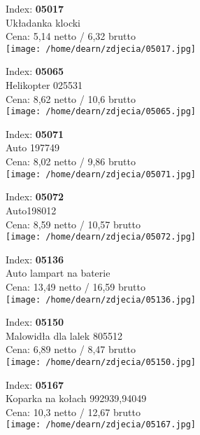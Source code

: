 {Index: \textbf{05017}\\
Układanka klocki\\
Cena: 5,14 netto / 6,32 brutto\\
  \texttt{[image: /home/dearn/zdjecia/05017.jpg]}}\newline\newline

{Index: \textbf{05065}\\
Helikopter 025531\\
Cena: 8,62 netto / 10,6 brutto\\
  \texttt{[image: /home/dearn/zdjecia/05065.jpg]}}\newline\newline

{Index: \textbf{05071}\\
Auto 197749\\
Cena: 8,02 netto / 9,86 brutto\\
  \texttt{[image: /home/dearn/zdjecia/05071.jpg]}}\newline\newline

{Index: \textbf{05072}\\
Auto198012\\
Cena: 8,59 netto / 10,57 brutto\\
  \texttt{[image: /home/dearn/zdjecia/05072.jpg]}}\newline\newline

{Index: \textbf{05136}\\
Auto lampart na baterie\\
Cena: 13,49 netto / 16,59 brutto\\
  \texttt{[image: /home/dearn/zdjecia/05136.jpg]}}\newline\newline

{Index: \textbf{05150}\\
Malowidła dla lalek 805512\\
Cena: 6,89 netto / 8,47 brutto\\
  \texttt{[image: /home/dearn/zdjecia/05150.jpg]}}\newline\newline

{Index: \textbf{05167}\\
Koparka na kołach 992939,94049\\
Cena: 10,3 netto / 12,67 brutto\\
  \texttt{[image: /home/dearn/zdjecia/05167.jpg]}}\newline\newline

